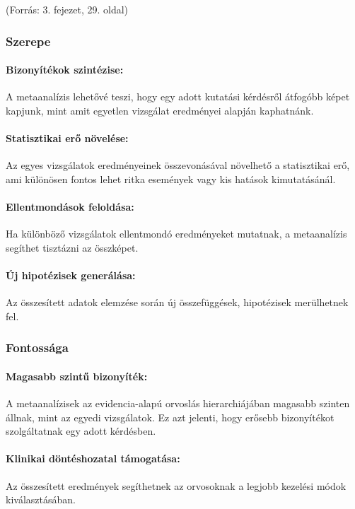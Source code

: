 \documentclass[a4paper,12pt]{article}
\begin{document}
(Forrás: 3. fejezet, 29. oldal)

\subsubsection{Szerepe}

\paragraph{Bizonyítékok szintézise:}
A metaanalízis lehetővé teszi, hogy egy adott kutatási kérdésről átfogóbb képet kapjunk, mint amit egyetlen vizsgálat eredményei alapján kaphatnánk.

\paragraph{Statisztikai erő növelése:}
Az egyes vizsgálatok eredményeinek összevonásával növelhető a statisztikai erő, ami különösen fontos lehet ritka események vagy kis hatások kimutatásánál.

\paragraph{Ellentmondások feloldása:}
Ha különböző vizsgálatok ellentmondó eredményeket mutatnak, a metaanalízis segíthet tisztázni az összképet.

\paragraph{Új hipotézisek generálása:}
Az összesített adatok elemzése során új összefüggések, hipotézisek merülhetnek fel.

\subsubsection{Fontossága}

\paragraph{Magasabb szintű bizonyíték:}
A metaanalízisek az evidencia-alapú orvoslás hierarchiájában magasabb szinten állnak, mint az egyedi vizsgálatok. Ez azt jelenti, hogy erősebb bizonyítékot szolgáltatnak egy adott kérdésben.

\paragraph{Klinikai döntéshozatal támogatása:}
Az összesített eredmények segíthetnek az orvosoknak a legjobb kezelési módok kiválasztásában.
\end{document}
